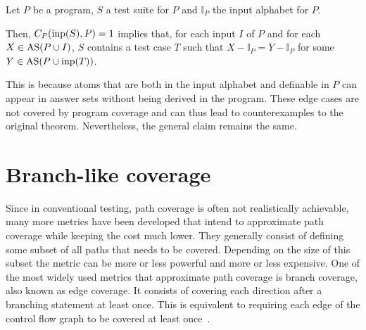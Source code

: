 \begin{theorem}
\label{th:program coverage}
    Let $P$ be a program, $S$ a test suite for $P$ and $\mathbb{I}_P$ the input alphabet for $P$.

    Then, \(C_P(\operatorname{inp}(S), P) = 1\) implies that, for each input $I$ of $P$ and for each \(X \in \operatorname{AS}(P \cup I)\), $S$ contains a test case $T$ such that \(X - \mathbb{I}_P = Y - \mathbb{I}_P\) for some \(Y \in \operatorname{AS}(P \cup \operatorname{inp}(T))\).
\end{theorem}

This is because atoms that are both in the input alphabet and definable in $P$ can appear in answer sets without being derived in the program. These edge cases are not covered by program coverage and can thus lead to counterexamples to the original theorem. Nevertheless, the general claim remains the same.
 


\begin{comment}
    - Analogous to the conventional path-like coverage I define program coverage    \/
    
    - Definition + example      \/
    
    - show that total program coverage means all possible answer sets get produced by the testsuite
    
    - talk about the problems here? (complexity + not possible for programs with variables as it is necessary to enumerate all 
    possible inputs to find maximum coverage)
\end{comment}

\section{Branch-like coverage}
\label{sec:Coverage metrics/Branch-like coverage}
Since in conventional testing, path coverage is often not realistically achievable, many more metrics have been developed that intend to approximate path coverage while keeping the cost much lower. They generally consist of defining some subset of all paths that needs to be covered. Depending on the size of this subset the metric can be more or less powerful and more or less expensive. One of the most widely used metrics that approximate path coverage is branch coverage, also known as edge coverage. It consists of covering each direction after a branching statement at least once. This is equivalent to requiring each edge of the control flow graph to be covered at least once~\cite[Chapter 7.2]{AO16}.

